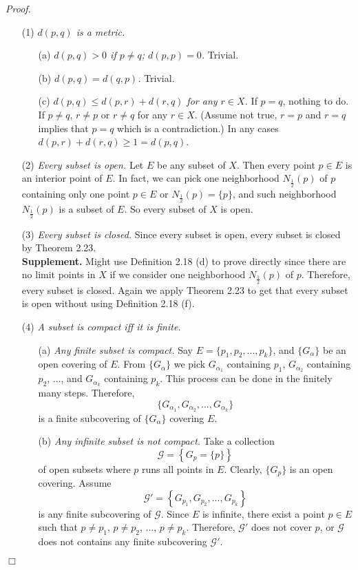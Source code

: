 \documentclass{article}
\begin{document}
\emph{Proof.}
\begin{enumerate}
\item[(1)] \emph{$d(p, q)$ is a metric.}
\begin{enumerate}
\item[(a)] \emph{$d(p, q) > 0$ if $p \neq q$; $d(p, p) = 0$.} Trivial.
\item[(b)] \emph{$d(p, q) = d(q, p)$.} Trivial.
\item[(c)] \emph{$d(p, q) \leq d(p, r) + d(r, q)$ for any $r \in X$.}
If $p = q$, nothing to do. If $p \neq q$, $r \neq p$ or $r \neq q$ for any $r \in X$.
(Assume not true, $r = p$ and $r = q$ implies that $p = q$ which is a contradiction.)
In any cases $d(p, r) + d(r, q) \geq 1 = d(p, q)$.
\end{enumerate}
\item[(2)] \emph{Every subset is open.}
Let $E$ be any subset of $X$.
Then every point $p \in E$ is an interior point of $E$.
In fact, we can pick one neighborhood $N_{\frac{1}{2}}(p)$ of $p$
containing only one point $p \in E$ or $N_{\frac{1}{2}}(p) = \{ p \}$,
and such neighborhood $N_{\frac{1}{2}}(p)$ is a subset of $E$.
So every subset of $X$ is open.
\item[(3)] \emph{Every subset is closed.}
Since every subset is open, every subset is closed by Theorem 2.23. \\

\textbf{Supplement.}
Might use Definition 2.18 (d) to prove directly since there are no limit points in $X$
if we consider one neighborhood $N_{\frac{1}{2}}(p)$ of $p$.
Therefore, every subset is closed.
Again we apply Theorem 2.23 to get that every subset is open
without using Definition 2.18 (f).
\item[(4)] \emph{A subset is compact iff it is finite.}
\begin{enumerate}
\item[(a)]
\emph{Any finite subset is compact.}
Say $E = \{p_1, p_2, ..., p_k\}$, and $\{ G_{\alpha} \}$ be an open covering of $E$.
From $\{ G_{\alpha} \}$
we pick
$G_{\alpha_1}$ containing $p_1$,
$G_{\alpha_2}$ containing $p_2$, ..., and
$G_{\alpha_k}$ containing $p_k$.
This process can be done in the finitely many steps.
Therefore,
$$\{ G_{\alpha_1}, G_{\alpha_2}, ..., G_{\alpha_k} \}$$
is a finite subcovering of $\{ G_{\alpha} \}$ covering $E$.
\item[(b)]
\emph{Any infinite subset is not compact.}
Take a collection
$$\mathscr{G} = \left\{ G_p = \{ p \} \right\}$$
of open subsets where $p$ runs all points in $E$.
Clearly, $\{ G_p \}$ is an open covering.
Assume
$$\mathscr{G}' = \left\{ G_{p_1}, G_{p_2}, ..., G_{p_k} \right\}$$
is any finite subcovering of $\mathscr{G}$.
Since $E$ is infinite, there exist a point $p \in E$ such that
$p \neq p_1$,
$p \neq p_2$, ...,
$p \neq p_k$.
Therefore, $\mathscr{G}'$ does not cover $p$,
or $\mathscr{G}$ does not contains any finite subcovering $\mathscr{G}'$.
\end{enumerate}
\end{enumerate}
$\Box$ \\
\end{document}
